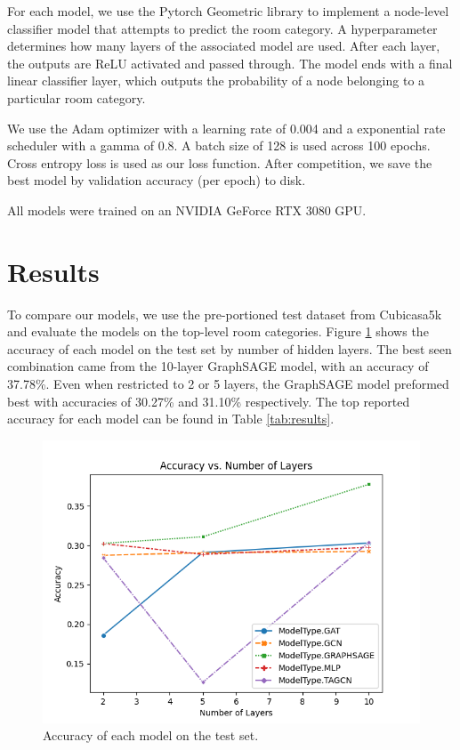 \documentclass{article}
\begin{document}
For each model, we use the Pytorch Geometric library \cite{pytorch_geometric} to implement a node-level classifier model that attempts to predict the room category. A hyperparameter determines how many layers of the associated model are used. After each layer, the outputs are ReLU activated and passed through. The model ends with a final linear classifier layer, which outputs the probability of a node belonging to a particular room category.

We use the Adam optimizer with a learning rate of 0.004 and a exponential rate scheduler with a gamma of 0.8. A batch size of 128 is used across 100 epochs. Cross entropy loss is used as our loss function. After competition, we save the best model by validation accuracy (per epoch) to disk.

All models were trained on an NVIDIA GeForce RTX 3080 GPU.


\section{Results}

To compare our models, we use the pre-portioned test dataset from Cubicasa5k and evaluate the models on the top-level room categories. Figure \ref{fig:accuracy} shows the accuracy of each model on the test set by number of hidden layers. The best seen combination came from the 10-layer GraphSAGE model, with an accuracy of 37.78\%. Even when restricted to 2 or 5 layers, the GraphSAGE model preformed best with accuracies of 30.27\% and 31.10\% respectively. The top reported accuracy for each model can be found in Table \ref{tab:results}.

\begin{figure}
    \centering
    \includegraphics[width=.75\textwidth]{figures/acc-layers.png}
    \caption{Accuracy of each model on the test set.}
    \label{fig:accuracy}
\end{figure}
\end{document}

